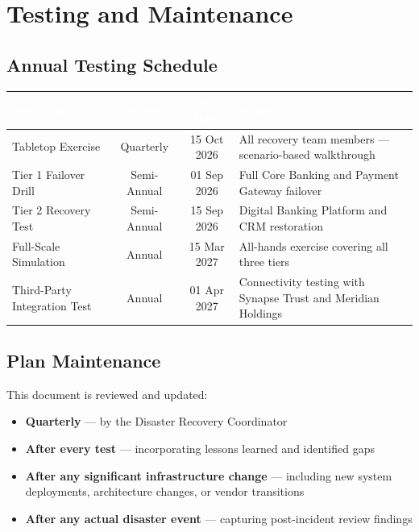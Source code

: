 \section{Testing and Maintenance}

\subsection{Annual Testing Schedule}

\begin{tabularx}{\textwidth}{@{}l c c X@{}}
  \toprule
  \rowcolor{tablehead}
  \textcolor{white}{\textbf{Test Type}} & \textcolor{white}{\textbf{Frequency}} & \textcolor{white}{\textbf{Next Date}} & \textcolor{white}{\textbf{Scope}}\\
  \midrule
  Tabletop Exercise & Quarterly & 15 Oct 2026 & All recovery team members --- scenario-based walkthrough\\
  \rowcolor{tablerow}
  Tier 1 Failover Drill & Semi-Annual & 01 Sep 2026 & Full Core Banking and Payment Gateway failover\\
  Tier 2 Recovery Test & Semi-Annual & 15 Sep 2026 & Digital Banking Platform and CRM restoration\\
  \rowcolor{tablerow}
  Full-Scale Simulation & Annual & 15 Mar 2027 & All-hands exercise covering all three tiers\\
  Third-Party Integration Test & Annual & 01 Apr 2027 & Connectivity testing with Synapse Trust and Meridian Holdings\\
  \bottomrule
\end{tabularx}

\subsection{Plan Maintenance}

This document is reviewed and updated:
\begin{itemize}[nosep, leftmargin=*]
  \item \textbf{Quarterly} --- by the Disaster Recovery Coordinator
  \item \textbf{After every test} --- incorporating lessons learned and identified gaps
  \item \textbf{After any significant infrastructure change} --- including new system deployments, architecture changes, or vendor transitions
  \item \textbf{After any actual disaster event} --- capturing post-incident review findings
\end{itemize}

